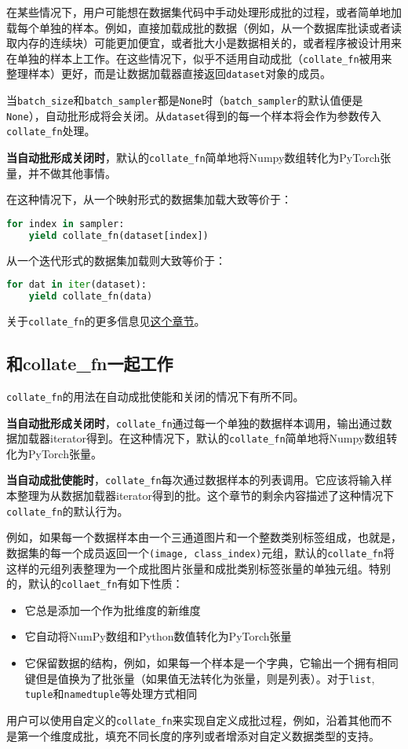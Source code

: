 \documentclass[../main.tex]{subfile}
\begin{document}
在某些情况下，用户可能想在数据集代码中手动处理形成批的过程，或者简单地加载每个单独的样本。例如，直接加载成批的数据（例如，从一个数据库批读或者读取内存的连续块）可能更加便宜，或者批大小是数据相关的，或者程序被设计用来在单独的样本上工作。在这些情况下，似乎不适用自动成批（\lstinline{collate_fn}被用来整理样本）更好，而是让数据加载器直接返回\lstinline{dataset}对象的成员。

当\lstinline{batch_size}和\lstinline{batch_sampler}都是\lstinline{None}时（\lstinline{batch_sampler}的默认值便是\lstinline{None}），自动批形成将会关闭。从\lstinline{dataset}得到的每一个样本将会作为参数传入\lstinline{collate_fn}处理。

\textbf{当自动批形成关闭时}，默认的\lstinline{collate_fn}简单地将Numpy数组转化为PyTorch张量，并不做其他事情。

在这种情况下，从一个映射形式的数据集加载大致等价于：
\begin{lstlisting}[language=Python]
for index in sampler:
    yield collate_fn(dataset[index])
\end{lstlisting}
从一个迭代形式的数据集加载则大致等价于：
\begin{lstlisting}[language=Python]
for dat in iter(dataset):
    yield collate_fn(data)
\end{lstlisting}
关于\lstinline{collate_fn}的更多信息见\href{https://pytorch.org/docs/stable/data.html#dataloader-collate-fn}{这个章节}。

\subsection{和collate\_fn一起工作}

\lstinline{collate_fn}的用法在自动成批使能和关闭的情况下有所不同。

\textbf{当自动批形成关闭时}，\lstinline{collate_fn}通过每一个单独的数据样本调用，输出通过数据加载器iterator得到。在这种情况下，默认的\lstinline{collate_fn}简单地将Numpy数组转化为PyTorch张量。

\textbf{当自动成批使能时}，\lstinline{collate_fn}每次通过数据样本的列表调用。它应该将输入样本整理为从数据加载器iterator得到的批。这个章节的剩余内容描述了这种情况下\lstinline{collate_fn}的默认行为。

例如，如果每一个数据样本由一个三通道图片和一个整数类别标签组成，也就是，数据集的每一个成员返回一个\lstinline{(image, class_index)}元组，默认的\lstinline{collate_fn}将这样的元组列表整理为一个成批图片张量和成批类别标签张量的单独元组。特别的，默认的\lstinline{collaet_fn}有如下性质：
\begin{itemize}
    \item 它总是添加一个作为批维度的新维度
    \item 它自动将NumPy数组和Python数值转化为PyTorch张量
    \item 它保留数据的结构，例如，如果每一个样本是一个字典，它输出一个拥有相同键但是值换为了批张量（如果值无法转化为张量，则是列表）。对于\lstinline{list}, \lstinline{tuple}和\lstinline{namedtuple}等处理方式相同
\end{itemize}

用户可以使用自定义的\lstinline{collate_fn}来实现自定义成批过程，例如，沿着其他而不是第一个维度成批，填充不同长度的序列或者增添对自定义数据类型的支持。
\end{document}
